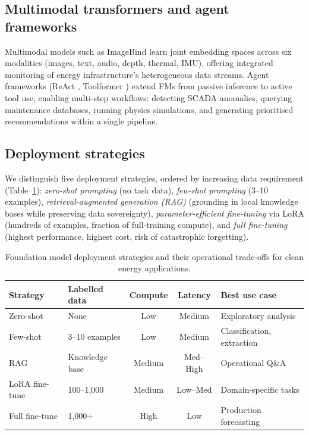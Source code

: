 \documentclass[preprint,12pt]{elsarticle}
\begin{document}
\subsection{Multimodal transformers and agent frameworks}
\label{subsec:multimodal}

Multimodal models such as ImageBind \cite{girdhar2023imagebind} learn joint embedding spaces across six modalities (images, text, audio, depth, thermal, IMU), offering integrated monitoring of energy infrastructure's heterogeneous data streams. Agent frameworks (ReAct \cite{yao2023react}, Toolformer \cite{schick2024toolformer}) extend FMs from passive inference to active tool use, enabling multi-step workflows: detecting SCADA anomalies, querying maintenance databases, running physics simulations, and generating prioritised recommendations within a single pipeline.

\subsection{Deployment strategies}
\label{subsec:deployment}

We distinguish five deployment strategies, ordered by increasing data requirement (Table~\ref{tab:deployment_strategies}): \textit{zero-shot prompting} (no task data), \textit{few-shot prompting} (3--10 examples), \textit{retrieval-augmented generation (RAG)} \cite{lewis2020rag} (grounding in local knowledge bases while preserving data sovereignty), \textit{parameter-efficient fine-tuning} via LoRA \cite{hu2022lora} (hundreds of examples, fraction of full-training compute), and \textit{full fine-tuning} (highest performance, highest cost, risk of catastrophic forgetting).

\begin{table}[htbp]
\centering
\caption{Foundation model deployment strategies and their operational trade-offs for clean energy applications.}
\label{tab:deployment_strategies}
\small
\begin{tabular}{@{}p{2.4cm}p{2.2cm}ccp{2.8cm}@{}}
\toprule
\textbf{Strategy} & \textbf{Labelled data} & \textbf{Compute} & \textbf{Latency} & \textbf{Best use case} \\
\midrule
Zero-shot & None & Low & Medium & Exploratory analysis \\
Few-shot & 3--10 examples & Low & Medium & Classification, extraction \\
RAG & Knowledge base & Medium & Med--High & Operational Q\&A \\
LoRA fine-tune & 100--1,000 & Medium & Low--Med & Domain-specific tasks \\
Full fine-tune & 1,000+ & High & Low & Production forecasting \\
\bottomrule
\end{tabular}
\end{table}
\end{document}
